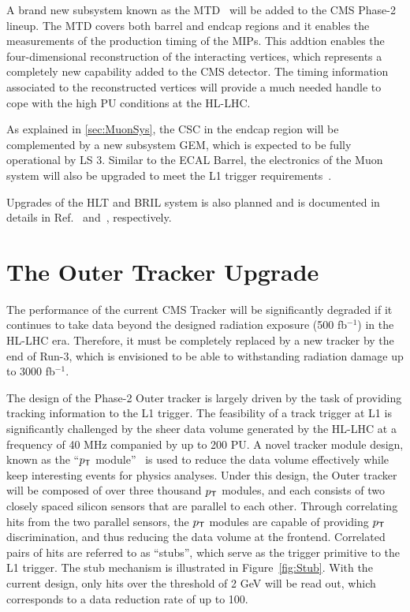 A brand new subsystem known as the \ac{MTD}~\cite{Butler:2019rpu} will be added to the \ac{CMS} Phase-2 lineup. The \ac{MTD} covers both barrel and endcap regions and it enables the measurements of the production timing of the \acp{MIP}. This addtion enables the four-dimensional reconstruction of the interacting vertices, which represents a completely new capability added to the \ac{CMS} detector. The timing information associated to the reconstructed vertices will provide a much needed handle to cope with the high \ac{PU} conditions at the \ac{HL-LHC}.

As explained in \autoref{sec:MuonSys}, the \ac{CSC} in the endcap region will be complemented by a new subsystem \ac{GEM}, which is expected to be fully operational by \ac{LS} 3. Similar to the \ac{ECAL} Barrel, the electronics of the Muon system will also be upgraded to meet the \ac{L1} trigger requirements~\cite{Hebbeker:2017bix}.

Upgrades of the \ac{HLT} and \ac{BRIL} system is also planned and is documented in details in Ref.~\cite{HLT:Upgrade} and~\cite{Beam:Upgrade}, respectively. 

\section{The Outer Tracker Upgrade}
\label{sec:OT}

The performance of the current \ac{CMS} Tracker will be significantly degraded if it continues to take data beyond the designed radiation exposure (500 fb$^{-1}$) in the \ac{HL-LHC} era. Therefore, it must be completely replaced by a new tracker by the end of Run-3, which is envisioned to be able to withstanding radiation damage up to 3000 fb$^{-1}$. 

The design of the Phase-2 Outer tracker is largely driven by the task of providing tracking information to the \ac{L1} trigger. The feasibility of a track trigger at \ac{L1} is significantly challenged by the sheer data volume generated by the \ac{HL-LHC} at a frequency of 40 MHz companied by up to 200 \ac{PU}. A novel tracker module design, known as the ``$p_{\textsf{T}}$ module''~\cite{Foudas:2005xf} is used to reduce the data volume effectively while keep interesting events for physics analyses. Under this design, the Outer tracker will be composed of over three thousand $p_{\textsf{T}}$ modules, and each consists of two closely spaced silicon sensors that are parallel to each other. Through correlating hits from the two parallel sensors, the $p_{\textsf{T}}$ modules are capable of providing $p_{\textsf{T}}$ discrimination, and thus reducing the data volume at the frontend. Correlated pairs of hits are referred to as ``stubs'', which serve as the trigger primitive to the \ac{L1} trigger. The stub mechanism is illustrated in Figure~\ref{fig:Stub}. With the current design, only hits over the threshold of 2 GeV will be read out, which corresponds to a data reduction rate of up to 100.

